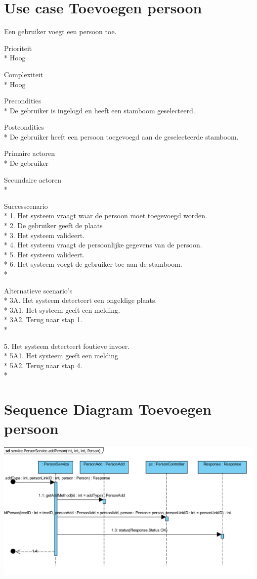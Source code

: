 \documentclass[pdftex,a4paper,12pt,twoside]{report}
\begin{document}
\section{Use case Toevoegen persoon}
Een gebruiker voegt een persoon toe.

Prioriteit\\*
Hoog

Complexiteit\\*
Hoog

Precondities \\*
De gebruiker is ingelogd en heeft een stamboom geselecteerd.

Postcondities \\*
De gebruiker heeft een persoon toegevoegd aan de geselecteerde stamboom.

Primaire actoren \\*
De gebruiker

Secundaire actoren \\*

Successcenario\\*
1. Het systeem vraagt waar de persoon moet toegevoegd worden.\\*
2. De gebruiker geeft de plaats \\*
3. Het systeem valideert.	\\*
4. Het systeem vraagt de persoonlijke gegevens van de persoon.\\*
5. Het systeem valideert.\\*
6. Het systeem voegt de gebruiker toe aan de stamboom.\\*

Alternatieve scenario’s\\*
3A. Het systeem detecteert een ongeldige plaats.\\*
3A1. Het systeem geeft een melding.\\*
3A2. Terug naar stap 1.\\*

5. Het systeem detecteert foutieve invoer.\\*
5A1. Het systeem geeft een melding\\*
5A2. Terug naar stap 4.\\*

\section{Sequence Diagram Toevoegen persoon}
\includegraphics[width=\textwidth]{images/persoontoevoegen.png}
\end{document}
